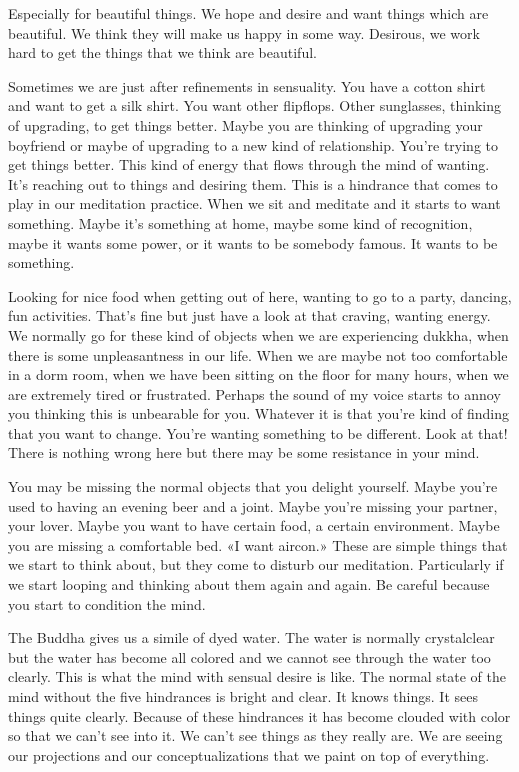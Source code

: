 \documentclass[letterpaper,10pt,english]{sphinxmanual}
\begin{document}
\sphinxAtStartPar
Especially  for  beautiful  things.  We  hope  and  desire  and  want  things
which are beautiful. We think they will make us happy in some way. Desirous, we work hard to get the things that we think are beautiful.

\sphinxAtStartPar
Sometimes  we  are  just  after  refinements  in  sensuality.  You  have  a
cotton  shirt  and  want  to  get  a  silk  shirt.  You  want  other  flip\sphinxhyphen{}flops.  Other
sunglasses, thinking of upgrading, to get things better. Maybe you are thinking  of  upgrading  your  boyfriend  or  maybe  of  upgrading  to  a  new  kind  of
relationship. You’re trying to get things better. This kind of energy that flows
through the mind of wanting. It’s reaching out to things and desiring them.
This is a hindrance that comes to play in our meditation practice. When we
sit  and  meditate  and  it  starts  to  want  something.  Maybe  it’s  something  at
home, maybe some kind of recognition, maybe it wants some power, or it
wants to be somebody famous. It wants to be something.

\sphinxAtStartPar
Looking  for  nice  food  when  getting  out  of  here,  wanting  to  go  to  a
party, dancing, fun activities. That’s fine but just have a look at that craving,
wanting energy. We normally go for these kind of objects when we are experiencing dukkha, when there is some unpleasantness in our life. When we are
maybe not too comfortable in a dorm room, when we have been sitting on
the floor for many hours, when we are extremely tired or frustrated. Perhaps
the sound of my voice starts to annoy you thinking this is unbearable for you.
Whatever it is that you’re kind of finding that you want to change. You’re
wanting something to be different. Look at that! There is nothing wrong here
but there may be some resistance in your mind.

\sphinxAtStartPar
You  may  be  missing  the  normal  objects  that  you  delight  yourself.
Maybe  you’re  used  to  having  an  evening  beer  and  a  joint.  Maybe  you’re
missing  your  partner,  your  lover.  Maybe  you  want  to  have  certain  food,  a
  certain  environment.  Maybe  you  are  missing  a  comfortable  bed.  «I  want
air\sphinxhyphen{}con.» These are simple things that we start to think about, but they come
to disturb our meditation. Particularly if we start looping and thinking about
them again and again. Be careful because you start to condition the mind.

\sphinxAtStartPar
The  Buddha  gives  us  a  simile  of  dyed  water.  The  water  is  normally
crystal\sphinxhyphen{}clear but the water has become all colored and we cannot see through
the water too clearly. This is what the mind with sensual desire is like. The
normal state of the mind without the five hindrances is bright and clear. It
knows things. It sees things quite clearly. Because of these hindrances it has
become clouded with color so that we can’t see into it. We can’t see things as
they really are. We are seeing our projections and our conceptualizations that
we paint on top of everything.
\end{document}
